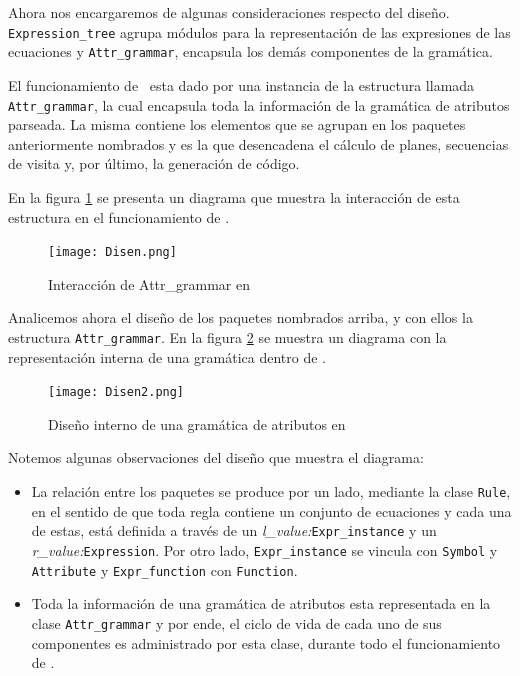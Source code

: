 Ahora nos encargaremos de algunas consideraciones respecto del diseño. 
\texttt{Expression\_tree} agrupa módulos para la representación de las expresiones de las ecuaciones y \texttt{Attr\_grammar}, encapsula los demás componentes de la gramática.

El funcionamiento de \maggen\ esta dado por una instancia de la estructura llamada \texttt{Attr\_grammar}, la cual encapsula toda la información de la gramática de atributos parseada. La misma contiene los elementos que se agrupan en los paquetes anteriormente nombrados y es la que desencadena el cálculo de planes, secuencias de visita y, por último, la generación de código. 
 
En la figura \ref{fig:disen} se presenta un diagrama que muestra la interacción de esta estructura en el funcionamiento de \maggen.

\begin{figure}[!ht]\centering
\texttt{[image: Disen.png]}
\caption{\label{fig:disen}Interacción de Attr\_grammar en \maggen}
\end{figure}

Analicemos ahora el diseño de los paquetes nombrados arriba, y con ellos la estructura \texttt{Attr\_grammar}.  En la figura \ref{fig:disen2} se muestra un diagrama con la representación interna de una gramática dentro de \maggen.

\begin{figure}[!ht]\centering
\texttt{[image: Disen2.png]}
\caption{\label{fig:disen2}Diseño interno de una gramática de atributos en \maggen}
\end{figure}

Notemos algunas observaciones del diseño que muestra el diagrama:

\begin{itemize}
\item La relación entre los paquetes se produce por un lado, mediante la clase \texttt{Rule}, en el sentido de que toda regla contiene un conjunto de ecuaciones y cada una de estas, está definida a través de un \textit{l\_value:}\texttt{Expr\_instance} y un \textit{r\_value:}\texttt{Expression}. Por otro lado, \texttt{Expr\_instance} se vincula con \texttt{Symbol} y \texttt{Attribute} y \texttt{Expr\_function} con \texttt{Function}.

\item Toda la información de una gramática de atributos esta representada en la clase \texttt{Attr\_grammar} y por ende, el ciclo de vida de cada uno de sus componentes es administrado por esta clase, durante todo el funcionamiento de \maggen. 
\end{itemize}

